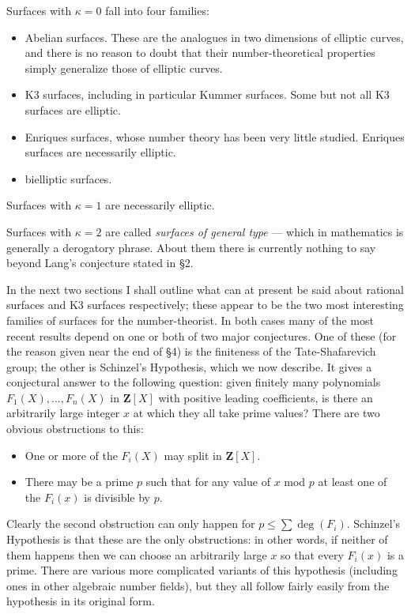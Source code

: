 \documentclass[12pt]{article}
\def\bZ{{\mathbf Z}}
\def\gk{{\kappa}}
\begin{document}
Surfaces with $\gk=0$ fall into four families:
\begin{itemize}
\item Abelian surfaces. These are the analogues in two dimensions of elliptic
curves, and there is no reason to doubt that their number-theoretical
properties simply generalize those of elliptic curves.
\item K3 surfaces, including in particular Kummer surfaces. Some but not all
K3 surfaces are elliptic.
\item Enriques surfaces, whose number theory has been very little studied.
Enriques surfaces are necessarily elliptic.
\item bielliptic surfaces.
\end{itemize}

Surfaces with $\gk=1$ are necessarily elliptic.

Surfaces with $\gk=2$ are called \emph{surfaces of general type} --- which in
mathematics is generally a derogatory phrase. About them there is currently
nothing to say beyond Lang's conjecture stated in \S2.

\medskip

In the next two sections I shall outline what can at present be said about
rational surfaces and K3 surfaces respectively; these appear to be the two
most interesting families of surfaces for the
number-theorist. In both cases many of the most
recent results depend on one or both of two major conjectures. One of these
(for the reason given near the end of \S4) is
the finiteness of the Tate-Shafarevich group; the other is
Schinzel's Hypothesis, which we now describe. It gives a conjectural answer
to the following question: given finitely many polynomials $F_1(X),\ldots,
F_n(X)$ in $\bZ[X]$ with positive leading coefficients, is there an
arbitrarily large integer $x$ at which they all take prime values? There are
two obvious obstructions to this:
\begin{itemize}
\item One or more of the $F_i(X)$ may split in $\bZ[X]$.
\item There may be a prime $p$ such that for any value of $x$ mod $p$ at
least one of the $F_i(x)$ is divisible by $p$.
\end{itemize}
Clearly the second obstruction can only happen for $p\leq\sum\deg(F_i)$.
Schinzel's Hypothesis is that these are the only obstructions: in other words,
if neither of them happens then we can choose an arbitrarily large $x$ so
that every $F_i(x)$ is a prime. There are various more complicated variants of
this hypothesis (including ones in other algebraic
number fields), but they all follow
fairly easily from the hypothesis in its original form.
\end{document}
